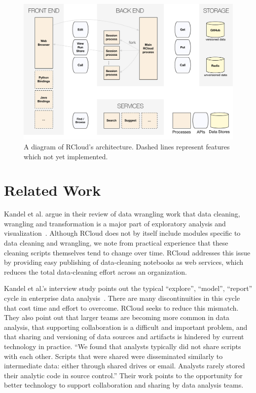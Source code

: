 \begin{figure}
\includegraphics[width=\linewidth]{fig/system/system.pdf}
\caption{\label{fig:system}A diagram of RCloud's architecture. Dashed
  lines represent features which not yet implemented.}
\end{figure}

\section{Related Work}

Kandel et al. argue in their review of data wrangling work that data
cleaning, wrangling and transformation is a major part of exploratory
analysis and visualization~\cite{Kandel:2011:RDI}. Although RCloud
does not by itself include modules specific to data cleaning and
wrangling, we note from practical experience that these cleaning
scripts themselves tend to change over time. RCloud addresses this
issue by providing easy publishing of data-cleaning notebooks as web
services, which reduces the total data-cleaning effort across an
organization.

Kandel et al.'s interview study points out the typical ``explore'',
``model'', ``report'' cycle in enterprise data
analysis~\cite{Kandel:2012:EDA}. There are many discontinuities in
this cycle that cost time and effort to overcome. RCloud seeks to
reduce this mismatch. They also point out that larger teams
are becoming more common in data analysis, that supporting
collaboration is a difficult and important problem, and that sharing
and versioning of data sources and artifacts is hindered by current
technology in practice. ``We found that analysts typically did not
share scripts with each other. Scripts that were shared were
disseminated similarly to intermediate data: either through shared
drives or email. Analysts rarely stored their analytic code in source
control.'' Their work points to the opportunity for better technology
to support collaboration and sharing by data analysis teams.

